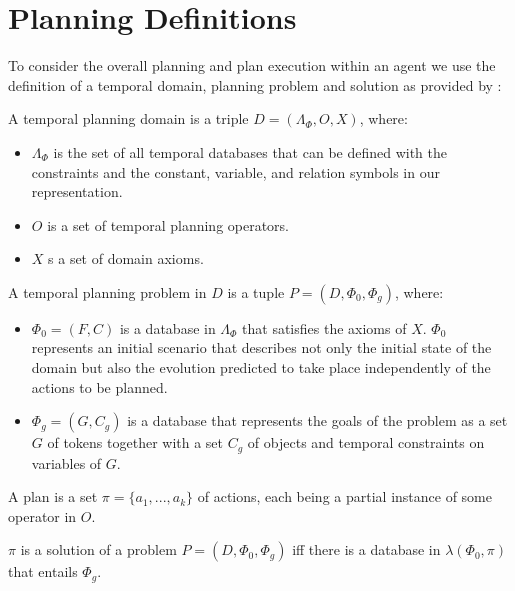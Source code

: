 \section{Planning Definitions}

To consider the overall planning and plan execution within an agent we
use the definition of a temporal domain, planning problem and solution
as provided by \cite{Nau:2004}:
\begin{definition}
  \label{def:domain}
  A temporal planning domain is a triple $D = ( \Lambda_\Phi, O, X )$, where:
  \begin{itemize}
  \item $\Lambda_\Phi$ is the set of all temporal databases that can be 
    defined with the constraints and the constant, variable, and relation 
    symbols in our representation.
  \item $O$ is a set of temporal planning operators.
  \item $X$ s a set of domain axioms.
  \end{itemize}
\end{definition}

\begin{definition}
  \label{def:problem}
  A temporal planning problem in $D$ is a tuple $P = ( D, \Phi_0, \Phi_g )$, where:
  \begin{itemize}
  \item $\Phi_0 = (F, C)$ is a database in $\Lambda_\Phi$ that satisfies the axioms of $X$.
    $\Phi_0$ represents an initial scenario that describes not only the initial 
    state of the domain but also the evolution predicted to take place 
    independently of the actions to be planned.
  \item $\Phi_g = (G, C_g)$ is a database that represents the goals of the problem 
    as a set $G$ of tokens together with a set $C_g$ of objects and temporal 
    constraints on variables of $G$. 
  \end{itemize}
\end{definition}

\begin{definition}
  \label{def:plan}
A plan is a set $\pi = \{a_1,...,a_k\}$ of actions, each
  being a partial instance of some operator in $O$.  

  $\pi$ is a solution of a problem $P = (D, \Phi_0, \Phi_g)$ iff
  there is a  database in $\lambda(\Phi_0, \pi)$ that entails $\Phi_g$.
\end{definition}

